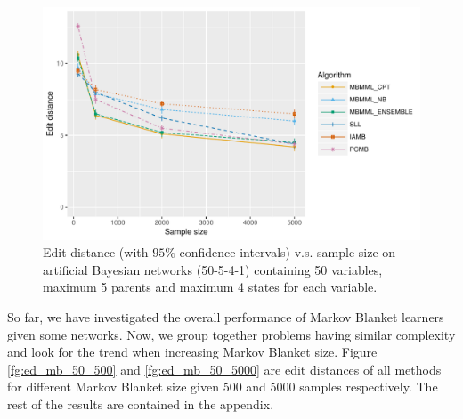 \documentclass{svmult}
\begin{document}
\begin{figure}[hbt]
  \centering
    \includegraphics[scale=0.6]{figures/ed_vs_samplesize_50_5_4_1.pdf}
  \caption{Edit distance (with $95\%$ confidence intervals) v.s. sample size on artificial Bayesian networks (50-5-4-1) containing 50 variables, maximum 5 parents and maximum 4 states for each variable.}
  \label{fg:50}
\end{figure}

So far, we have investigated the overall performance of Markov Blanket learners given some networks. Now, we group together problems having similar complexity and look for the trend when increasing Markov Blanket size. Figure \ref{fg:ed_mb_50_500} and \ref{fg:ed_mb_50_5000} are edit distances of all methods for different Markov Blanket size given 500 and 5000 samples respectively. The rest of the results are contained in the appendix.  
\end{document}
